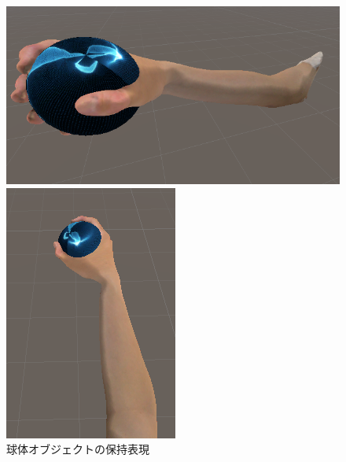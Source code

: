 \documentclass{ltjsreport}
\begin{document}
		\begin{figure}[H]
		\centering
		\begin{minipage}{0.4\columnwidth}
		\centering
		\includegraphics[width = \columnwidth]{../figs/grapsphere_side.png}
		\end{minipage}
		\hspace{0.04\columnwidth}
		\begin{minipage}{0.18\columnwidth}
		\centering
		\includegraphics[width = \columnwidth]{../figs/grapsphere_up.png}
		\end{minipage}
		\caption{球体オブジェクトの保持表現}
		\label{fig:spherehold}
		\end{figure}
\end{document}
